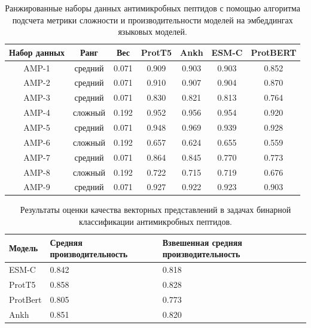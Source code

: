 \documentclass[specification,annotation,times]{itmo-student-thesis}
\begin{document}
\begin{table}[h]
\centering
\caption{Ранжированные наборы данных антимикробных пептидов с помощью алгоритма подсчета метрики сложности и производительности моделей на эмбеддингах языковых моделей.}
\label{tab:model_performance_amp}

\begin{tabular}{|c|c|c|c|c|c|c|}
\hline
Набор данных & Ранг & Вес & ProtT5 & Ankh & ESM-C & ProtBERT \\
\hline
AMP-1 & средний & 0.071 & 0.909 & 0.903 & 0.903 & 0.852 \\ \hline
AMP-2 & средний & 0.071 & 0.910 & 0.907 & 0.904 & 0.870 \\ \hline
AMP-3 & средний & 0.071 & 0.830 & 0.821 & 0.813 & 0.764 \\ \hline
AMP-4 & сложный & 0.192 & 0.952 & 0.956 & 0.954 & 0.920 \\ \hline
AMP-5 & средний & 0.071 & 0.948 & 0.969 & 0.939 & 0.928 \\ \hline
AMP-6 & сложный & 0.192 & 0.657 & 0.624 & 0.655 & 0.559 \\ \hline
AMP-7 & средний & 0.071 & 0.864 & 0.845 & 0.770 & 0.773 \\ \hline
AMP-8 & сложный & 0.192 & 0.722 & 0.715 & 0.719 & 0.676 \\ \hline
AMP-9 & средний & 0.071 & 0.927 & 0.922 & 0.923 & 0.903 \\ \hline
\end{tabular}

\end{table}


\begin{table}[h]
\centering

\caption{Результаты оценки качества векторных представлений в задачах бинарной классификации антимикробных пептидов.}
\label{tab:compare_results_amp}
\begin{tabular}{|p{3cm}|p{5cm}|p{5cm}|}
\hline
Модель & Средняя \newline производительность & Взвешенная \newline средняя \newline производительность \\
\hline
ESM-C & 0.842 & 0.818 \\ \hline
ProtT5 & 0.858 & 0.828 \\ \hline
ProtBert & 0.805 & 0.773 \\ \hline
Ankh & 0.851 & 0.820 \\ \hline
\end{tabular}

\end{table}
\end{document}
